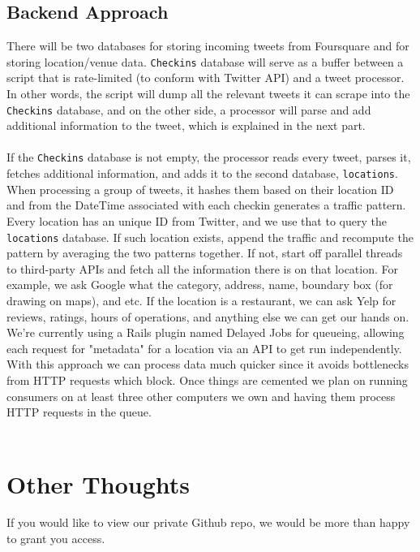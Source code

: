 \documentclass{article}
\begin{document}
\subsection{Backend Approach}
There will be two databases for storing incoming tweets from Foursquare and for storing
location/venue data. \verb|Checkins| database will serve as a buffer between a script that is rate-limited
(to conform with Twitter API) and a tweet processor. In other words, the script will dump all the relevant 
tweets it can scrape into the \verb|Checkins| database, and on the other side, a processor will parse and
add additional information to the tweet, which is explained in the next part. \\ \\
If the \verb|Checkins| database is not empty, the processor reads every tweet, parses it, fetches additional information, and adds it to the second database, \verb|locations|. When processing a group of tweets, it hashes them based on their location ID and from the DateTime associated with each checkin generates a traffic pattern. Every location has an unique ID from Twitter, and we use that to query the \verb|locations| database. If such location exists, append the traffic and recompute the pattern by averaging the two patterns together. If not, start off parallel threads to
third-party APIs and fetch all the information there is on that location. For example, we ask Google what the category, address, name, boundary box (for drawing on maps), and etc. If the location is a restaurant, we can ask Yelp for reviews, ratings, hours of operations, and anything else we can get our hands on. We're currently using a Rails plugin named Delayed Jobs for queueing, allowing each request for "metadata" for a location via an API to get run independently. With this approach we can process data much quicker since it avoids bottlenecks from HTTP requests which block. Once things are cemented we plan on running consumers on at least three other computers we own and having them process HTTP requests in the queue.\\ \\

\section{Other Thoughts}
If you would like to view our private Github repo, we would be more than happy to grant you access.
\end{document}
